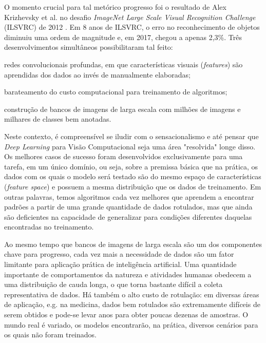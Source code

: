 \documentclass[
12pt, %
a4paper, %
onecolumn, %
]{article}
\begin{document}
O momento crucial para tal metórico progresso foi o resultado de Alex Krizhevsky et al.\cite{alexnet} no desafio \textit{ImageNet Large Scale Visual Recognition Challenge}  (ILSVRC) de 2012 \cite{goodfellow}. Em 8 anos de ILSVRC, o erro no reconhecimento de objetos diminuiu uma ordem de magnitude\cite{fei} e, em 2017, chegou a apenas 2,3\%. Três desenvolvimentos simultâneos possibilitaram tal feito\cite{horn}: 
\begin{enumerate*}[label=(\alph*)]
  \item redes convolucionais profundas, em que características visuais (\textit{features}) são aprendidas dos dados ao invés de manualmente elaboradas;
  \item barateamento do custo computacional para treinamento de algoritmos;
  \item construção de bancos de imagens de larga escala com milhões de imagens e milhares de classes bem anotadas. 
\end{enumerate*}

Neste contexto, é compreensível se iludir com o sensacionalismo e até pensar que \textit{Deep Learning} para Visão Computacional seja uma área "resolvida" \textemdash longe disso. Os melhores casos de sucesso foram desenvolvidos exclusivamente para uma tarefa, em um único domínio, ou seja, sobre a premissa básica que na prática, os dados com os quais o modelo será testado são do mesmo espaço de características (\textit{feature space}) e possuem a mesma distribuição que os dados de treinamento\cite{Pan}. Em outras palavras, temos algoritmos cada vez melhores que aprendem a encontrar padrões a partir de uma grande quantidade de dados rotulados, mas que ainda são deficientes na capacidade de generalizar para condições diferentes daquelas encontradas no treinamento. 

Ao mesmo tempo que bancos de imagens de larga escala são um dos componentes chave para progresso, cada vez mais a necessidade de dados são um fator limitante para aplicação prática de inteligência artificial.  Uma quantidade importante de comportamentos da natureza e atividades humanas obedecem a uma distribuição de cauda longa, o que torna bastante difícil a coleta representativa de dados. Há também o  alto custo de rotulação: em diversas áreas de aplicação, e.g. na medicina, dados bem rotulados são extremamente difíceis de serem obtidos e pode-se levar anos para obter poucas dezenas de amostras. O mundo real é variado, os modelos encontrarão, na prática, diversos cenários para os quais não foram treinados.
\end{document}
